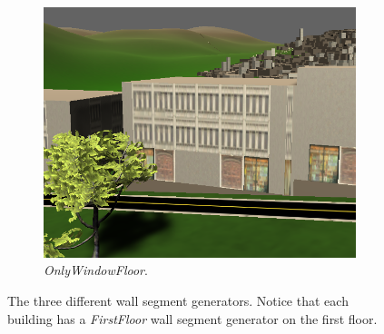 \begin{figure}[H]
\begin{subfigure}[b]{0.25\textwidth}
        \includegraphics[width=\textwidth]{figure/building-only-window.PNG}
        \caption{\textit{OnlyWindowFloor}.}
    \end{subfigure}
    
    \caption{The three different wall segment generators. Notice that each building has a \textit{FirstFloor} wall segment generator on the first floor.}
    \label{fig:wall-segment-generator}
  \end{figure}
  